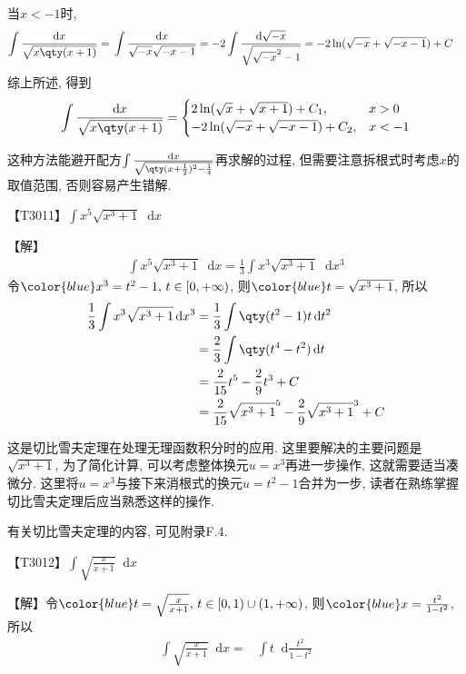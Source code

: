 \documentclass{ctexbook}
\newcommand*{\dif}{\mathop{}\!\mathrm{d}}
\begin{document}
{当$x<-1$时, 
\begin{align*}
\int\frac{\dif{x}}{\sqrt{x\qty(x+1)}}={}&\int\frac{\dif{x}}{\sqrt{-x}\sqrt{-x-1}}
=-2\int\frac{\dif{\sqrt{-x}}}{\sqrt{\sqrt{-x}^{2}-1}}
=-2\ln(\sqrt{-x}+\sqrt{-x-1})+C
\end{align*}
综上所述, 得到
\begin{align*}
\int\frac{\dif{x}}{\sqrt{x\qty(x+1)}}=\begin{cases}
2\ln(\sqrt{x}+\sqrt{x+1})+C_{1},&x>0\\
-2\ln(\sqrt{-x}+\sqrt{-x-1})+C_{2},&x<-1
\end{cases}
\end{align*}\par
{\kaishu 这种方法能避开配方$\int\frac{\dif{x}}{\sqrt{\qty(x+\frac{1}{2})^{2}-\frac{1}{4}}}$再求解的过程, 但需要注意拆根式时考虑$x$的取值范围, 否则容易产生错解. \par}
{\color{red}【T3011】}$\int x^{5}\sqrt{x^{3}+1}\dif{x}$\par
【解】
\begin{align*}
\int x^{5}\sqrt{x^{3}+1}\dif{x}=\frac{1}{3}\int x^{3}\sqrt{x^{3}+1}\dif{x^{3}}
\end{align*}
令$\color{blue}x^{3}=t^{2}-1,\,t\in\left[0,+\infty\right)$, 则$\color{blue}t=\sqrt{x^{3}+1}$, 所以
\begin{align*}
\frac{1}{3}\int x^{3}\sqrt{x^{3}+1}\dif{x^{3}}={}&\frac{1}{3}\int\qty(t^{2}-1)t\dif{t^{2}}\\
={}&\frac{2}{3}\int\qty(t^{4}-t^{2})\dif{t}\\
={}&\frac{2}{15}t^{5}-\frac{2}{9}t^{3}+C\\
={}&\frac{2}{15}\sqrt{x^{3}+1}^{5}-\frac{2}{9}\sqrt{x^{3}+1}^{3}+C
\end{align*}\par
{\kaishu 这是切比雪夫定理在处理无理函数积分时的应用. 这里要解决的主要问题是$\sqrt{x^{3}+1}$, 为了简化计算, 可以考虑整体换元$u=x^{3}$再进一步操作, 这就需要适当凑微分. 这里将$u=x^{3}$与接下来消根式的换元$u=t^{2}-1$合并为一步, 读者在熟练掌握切比雪夫定理后应当熟悉这样的操作. \par
有关切比雪夫定理的内容, 可见附录F.4. \par}
{\color{red}【T3012】}$\int\sqrt{\frac{x}{x+1}}\dif{x}$\par
【解】令$\color{blue}t=\sqrt{\frac{x}{x+1}},\,t\in\left[0,1\right)\cup\left(1,+\infty\right)$, 则$\color{blue}x=\frac{t^{2}}{1-t^{2}}$, 所以
\begin{align*}
\int\sqrt{\frac{x}{x+1}}\dif{x}={}&\int t\dif{\frac{t^{2}}{1-t^{2}}}\\

\end{align*}}
\end{document}

